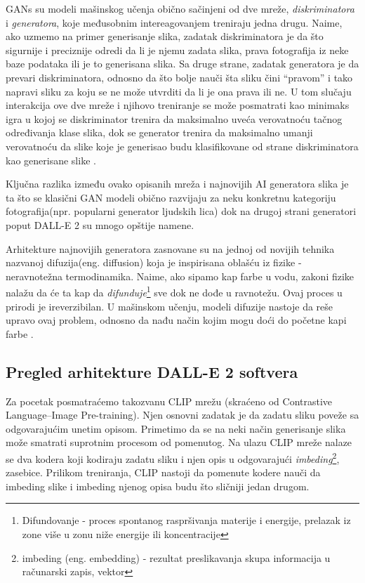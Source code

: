 \documentclass[12pt, letterpaper]{article}
\begin{document}
GANs su modeli mašinskog učenja obično sačinjeni od dve mreže, \textit{diskriminatora} i \textit{generatora}, koje međusobnim intereagovanjem treniraju jedna drugu. Naime, ako uzmemo na primer generisanje slika, zadatak diskriminatora je da što sigurnije i preciznije odredi da li je njemu zadata slika, prava fotografija iz neke baze podataka ili je to generisana slika. Sa druge strane, zadatak generatora je da prevari diskriminatora, odnosno da što bolje nauči šta sliku čini “pravom” i tako napravi sliku za koju se ne može utvrditi da li je ona prava ili ne. U tom slučaju interakcija ove dve mreže i njihovo treniranje se može posmatrati kao minimaks igra u kojoj se diskriminator trenira da maksimalno uveća verovatnoću tačnog određivanja klase slika, dok se generator trenira da maksimalno umanji verovatnoću da slike koje je generisao budu klasifikovane od strane diskriminatora kao generisane slike \cite{gan}.

Ključna razlika između ovako opisanih mreža i najnovijih AI generatora slika je ta što se klasični GAN modeli obično razvijaju za neku konkretnu kategoriju fotografija(npr. popularni generator ljudskih lica) dok na drugoj strani generatori poput DALL-E 2 su mnogo opštije namene.

Arhitekture najnovijih generatora zasnovane su na jednoj od novijih tehnika nazvanoj difuzija(eng. diffusion) koja je inspirisana oblašću iz fizike - neravnotežna termodinamika. Naime, ako sipamo kap farbe u vodu, zakoni fizike nalažu da će ta kap da \textit{difunduje}\footnote{Difundovanje - proces spontanog raspršivanja materije i energije, prelazak iz zone više u zonu niže energije ili koncentracije} sve dok ne dođe u ravnotežu. Ovaj proces u prirodi je ireverzibilan. U mašinskom učenju, modeli difuzije nastoje da reše upravo ovaj problem, odnosno da nađu način kojim mogu doći do početne kapi farbe \cite{difvideo}.

\subsection{Pregled arhitekture DALL-E 2 softvera}

Za pocetak posmatraćemo takozvanu CLIP mrežu (skraćeno od Contrastive Language–Image Pre-training). Njen osnovni zadatak je da zadatu sliku poveže sa odgovarajućim unetim opisom. Primetimo da se na neki način generisanje slika može smatrati suprotnim procesom od pomenutog. Na ulazu CLIP mreže nalaze se dva kodera koji kodiraju zadatu sliku i njen opis u odgovarajući \textit{imbeding}\footnote{imbeding (eng. embedding) - rezultat preslikavanja skupa informacija u računarski zapis, vektor}, zasebice. Prilikom treniranja, CLIP nastoji da pomenute kodere nauči da imbeding slike i imbeding njenog opisa budu što sličniji jedan drugom\cite{openai_dali}.
\end{document}
